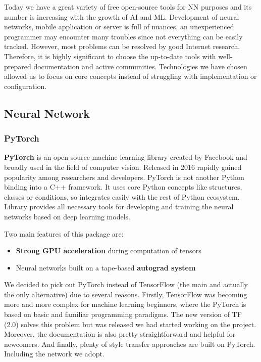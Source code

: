 \documentclass[../Main.tex]{subfiles}
\begin{document}
Today we have a great variety of free open-source tools for NN purposes and its
number is increasing with the growth of AI and ML. Development of neural networks,
mobile application or server is full of nuances, an unexperienced programmer may 
encounter many troubles since not everything can be easily tracked. However, most
problems can be resolved by good Internet research. Therefore, it is highly significant
to choose the up-to-date tools with well-prepared documentation and active communities. 
Technologies we have chosen allowed us to focus on core concepts instead of 
struggling with implementation or configuration.

\subsection{Neural Network}

    \subsubsection{PyTorch}
        \textbf{PyTorch} is an open-source machine learning library created by Facebook and broadly used in the field of computer vision. Released in 2016 \cite{pytorch} rapidly gained popularity among researchers and developers. PyTorch is not another Python binding into a C++ framework. It uses core Python concepts like structures, classes or conditions, so integrates easily with the rest of Python ecosystem. Library provides all necessary tools for developing and training the neural networks based on deep learning models.
        
        Two main features of this package are:
        \begin{itemize}
            \item \textbf{Strong GPU acceleration} during computation of tensors
            \item Neural networks built on a tape-based \textbf{autograd system}
        \end{itemize}
        
        We decided to pick out PyTorch instead of TensorFlow (the main and actually the only alternative) due to several reasons. Firstly, TensorFlow was becoming more and more complex for machine learning beginners, where the PyTorch is based on basic and familiar programming paradigms. The new version of TF (2.0) solves this problem but was released  we had started working on the project. Moreover, the documentation is also pretty straightforward and helpful for newcomers. And finally, plenty of style transfer approaches are built on PyTorch. Including the network we adopt. 
\end{document}
